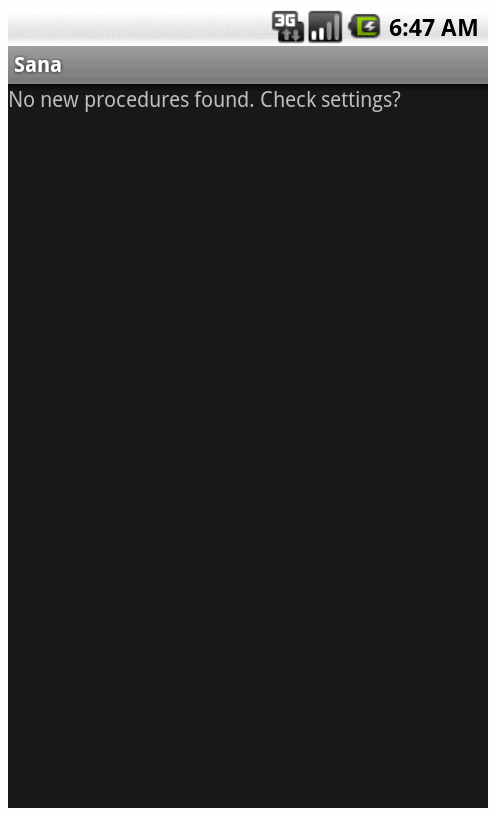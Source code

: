 \documentclass[a4paper,10pt]{article}
\begin{document}
\includegraphics[scale=0.2,keepaspectratio=true]{client_settings_procedures_available.png}
\end{document}
